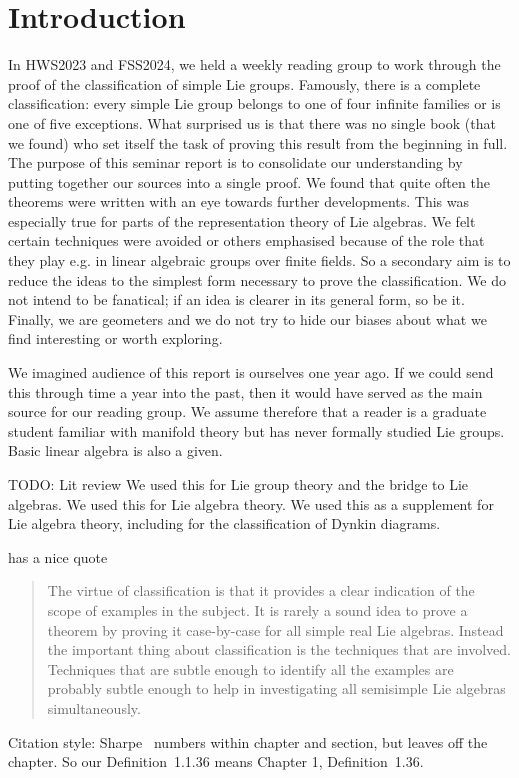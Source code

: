 \chapter{Introduction}

In HWS2023 and FSS2024, we held a weekly reading group to work through the proof of the classification of simple Lie groups.
Famously, there is a complete classification: every simple Lie group belongs to one of four infinite families or is one of five exceptions.
What surprised us is that there was no single book (that we found) who set itself the task of proving this result from the beginning in full.
The purpose of this seminar report is to consolidate our understanding by putting together our sources into a single proof.
We found that quite often the theorems were written with an eye towards further developments.
This was especially true for parts of the representation theory of Lie algebras.
We felt certain techniques were avoided or others emphasised because of the role that they play e.g. in linear algebraic groups over finite fields.
So a secondary aim is to reduce the ideas to the simplest form necessary to prove the classification.
We do not intend to be fanatical; if an idea is clearer in its general form, so be it.
Finally, we are geometers and we do not try to hide our biases about what we find interesting or worth exploring.

We imagined audience of this report is ourselves one year ago.
If we could send this through time a year into the past, then it would have served as the main source for our reading group. 
We assume therefore that a reader is a graduate student familiar with manifold theory but has never formally studied Lie groups.
Basic linear algebra is also a given.

TODO: Lit review
\cite{Warner1983} We used this for Lie group theory and the bridge to Lie algebras.
\cite{Hall2015} We used this for Lie algebra theory.
\cite{Fulton2004} We used this as a supplement for Lie algebra theory, including for the classification of Dynkin diagrams.

\cite[p.~349]{Knapp1986} has a nice quote 
\begin{quotation}
The virtue of classification is that it provides a clear indication of
the scope of examples in the subject. It is rarely a sound idea to prove
a theorem by proving it case-by-case for all simple real Lie algebras.
Instead the important thing about classification is the techniques that are
involved. Techniques that are subtle enough to identify all the examples
are probably subtle enough to help in investigating all semisimple Lie
algebras simultaneously.
\end{quotation}


Citation style:
Sharpe~\cite{Sharpe1997} numbers within chapter and section, but leaves off the chapter. So our Definition~1.1.36 means Chapter 1, Definition~1.36.